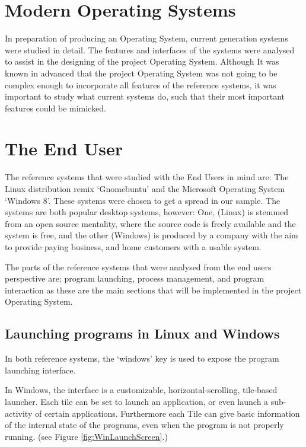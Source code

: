 \documentclass[a4paper]{report}
\begin{document}
\clearpage
\section{Modern Operating Systems}

In preparation of producing an Operating System, current generation systems were studied in detail. The features and interfaces of the systems were analysed to assist in the designing of the project Operating System. Although It was known in advanced that the project Operating System was not going to be complex enough to incorporate all features of the reference systems, it was important to study what current systems do, such that their most important features could be mimicked.

\section{The End User}
The reference systems that were studied with the End Users in mind are: The Linux distribution remix `Gnomebuntu' and the Microsoft Operating System `Windows 8'. These systems were chosen to get a spread in our sample. The systems are both popular desktop systems, however: One, (Linux) is stemmed from an open source mentality, where the source code is freely available and the system is free, and the other (Windows) is produced by a company with the aim to provide paying business, and home customers with a usable system.

The parts of the reference systems that were analysed from the end users perspective are; program launching, process management, and program interaction as these are the main sections that will be implemented in the project Operating System.

\subsection{Launching programs in Linux and Windows}

In both reference systems, the `windows' key is used to expose the program launching interface.

In Windows, the interface is a customizable, horizontal-scrolling, tile-based launcher. Each tile can be set to launch an application, or even launch a sub-activity of certain applications. Furthermore each Tile can give basic information of the internal state of the programs, even when the program is not properly running. (see Figure \ref{fig:WinLaunchScreen}.)
\end{document}
